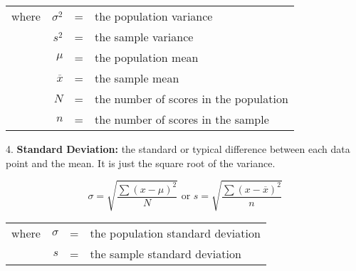\begin{center}
\begin{tabular}{rrcl}

where & $\sigma^2 $ & = & the population variance \\
& $s^2 $ & = & the sample variance\\
& $\mu$ & = & the population mean \\
& $\overline{x} $ & = & the sample mean\\
& $N$ & = & the number of scores in the population \\
& $n$ & = & the number of scores in the sample\\
\end{tabular} 
\end{center} 

4. \textbf{Standard Deviation: } the standard or typical difference between each data point and the mean. It is just the square root of the variance. 

$$ \sigma = \sqrt{\dfrac{\sum (x - \mu)^2 }{N}} \text{ or } s = \sqrt{\dfrac{\sum (x - \overline{x})^2 }{n}} $$

\begin{center}
\begin{tabular}{rrcl}

where & $\sigma $ & = & the population standard deviation \\
& $s$ & = & the sample standard deviation \\

\end{tabular} 
\end{center} 



